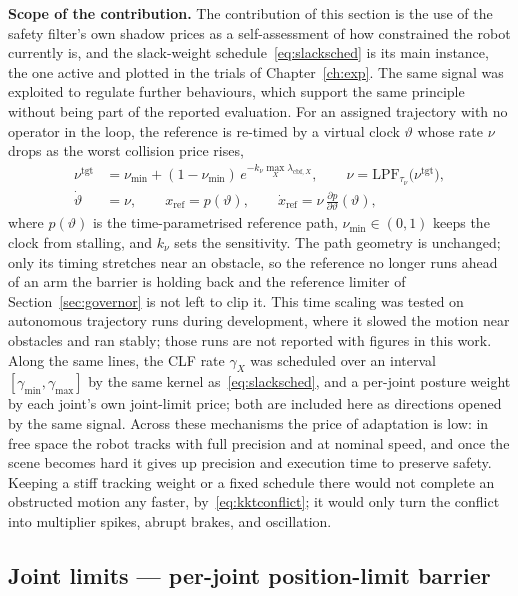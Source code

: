 \textbf{Scope of the contribution.} The contribution of this section is the use of the safety filter's own shadow prices as a self-assessment of how constrained the robot currently is, and the slack-weight schedule~\eqref{eq:slacksched} is its main instance, the one active and plotted in the trials of Chapter~\ref{ch:exp}. The same signal was exploited to regulate further behaviours, which support the same principle without being part of the reported evaluation. For an assigned trajectory with no operator in the loop, the reference is re-timed by a virtual clock $\vartheta$ whose rate $\nu$ drops as the worst collision price rises,
\begin{equation}
\begin{split}
\nu^{\text{tgt}} &= \nu_{\min} + (1 - \nu_{\min})\,e^{-k_{\nu}\max_X \lambda_{\text{cbf},X}},
\qquad
\nu = \text{LPF}_{\tau_{\nu}}\bigl(\nu^{\text{tgt}}\bigr),\\
\dot{\vartheta} &= \nu,
\qquad
x_{\text{ref}} = p(\vartheta),
\qquad
\dot{x}_{\text{ref}} = \nu\,\frac{\partial p}{\partial \vartheta}(\vartheta),
\end{split}
\label{eq:timescale}
\end{equation}
where $p(\vartheta)$ is the time-parametrised reference path, $\nu_{\min} \in (0,1)$ keeps the clock from stalling, and $k_{\nu}$ sets the sensitivity. The path geometry is unchanged; only its timing stretches near an obstacle, so the reference no longer runs ahead of an arm the barrier is holding back and the reference limiter of Section~\ref{sec:governor} is not left to clip it. This time scaling was tested on autonomous trajectory runs during development, where it slowed the motion near obstacles and ran stably; those runs are not reported with figures in this work. Along the same lines, the CLF rate $\gamma_X$ was scheduled over an interval $[\gamma_{\min}, \gamma_{\max}]$ by the same kernel as~\eqref{eq:slacksched}, and a per-joint posture weight by each joint's own joint-limit price; both are included here as directions opened by the same signal. Across these mechanisms the price of adaptation is low: in free space the robot tracks with full precision and at nominal speed, and once the scene becomes hard it gives up precision and execution time to preserve safety. Keeping a stiff tracking weight or a fixed schedule there would not complete an obstructed motion any faster, by~\eqref{eq:kktconflict}; it would only turn the conflict into multiplier spikes, abrupt brakes, and oscillation.

\subsection{Joint limits --- per-joint position-limit barrier}
\label{sec:jl}

